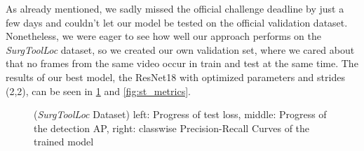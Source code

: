 As already mentioned, we sadly missed the official challenge deadline by just a few days and couldn't let our model be tested on the official validation dataset. Nonetheless, we were eager to see how well our approach performs on the \emph{SurgToolLoc} dataset, so we created our own validation set, where we cared about that no frames from the same video occur in train and test at the same time. The results of our best model, the ResNet18 with optimized parameters and strides (2,2), can be seen in \ref{fig:st_ap} and \ref{fig:st_metrics}.
\begin{figure}[h]
	\centering
	\caption{(\emph{SurgToolLoc} Dataset) left: Progress of test loss, middle: Progress of the detection AP, right: classwise Precision-Recall Curves of the trained model}
	\label{fig:st_ap}
\end{figure}


